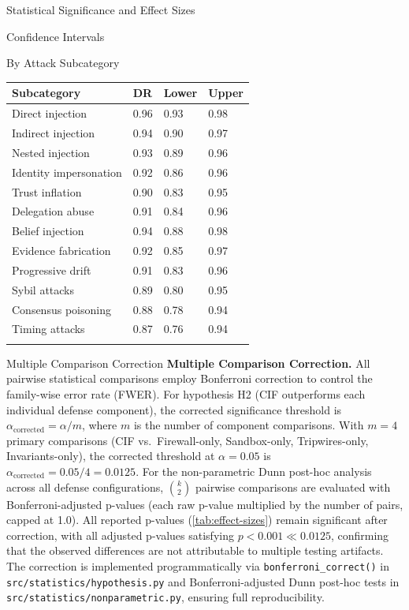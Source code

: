 \documentclass[
  ignorenonframetext,
]{beamer}
\newcounter{none} %
\begin{document}
\begin{frame}[fragile]{Statistical Significance and Effect Sizes}
\begin{block}{Confidence Intervals}
\begin{block}{By Attack Subcategory}
{\def\LTcaptype{none} %
\begin{longtable}[]{@{}llll@{}}
\toprule\noalign{}
Subcategory & DR & Lower & Upper \\
\midrule\noalign{}
\endhead
Direct injection & 0.96 & 0.93 & 0.98 \\
Indirect injection & 0.94 & 0.90 & 0.97 \\
Nested injection & 0.93 & 0.89 & 0.96 \\
Identity impersonation & 0.92 & 0.86 & 0.96 \\
Trust inflation & 0.90 & 0.83 & 0.95 \\
Delegation abuse & 0.91 & 0.84 & 0.96 \\
Belief injection & 0.94 & 0.88 & 0.98 \\
Evidence fabrication & 0.92 & 0.85 & 0.97 \\
Progressive drift & 0.91 & 0.83 & 0.96 \\
Sybil attacks & 0.89 & 0.80 & 0.95 \\
Consensus poisoning & 0.88 & 0.78 & 0.94 \\
Timing attacks & 0.87 & 0.76 & 0.94 \\
\bottomrule\noalign{}
\end{longtable}
}
\end{block}
\end{block}

\begin{block}{Multiple Comparison Correction}
\protect{}\label{sec:bonferroni}
\textbf{Multiple Comparison Correction.} All pairwise statistical
comparisons employ Bonferroni correction to control the family-wise
error rate (FWER). For hypothesis H2 (CIF outperforms each individual
defense component), the corrected significance threshold is
\(\alpha_{\text{corrected}} = \alpha / m\), where \(m\) is the number of
component comparisons. With \(m = 4\) primary comparisons (CIF
vs.~Firewall-only, Sandbox-only, Tripwires-only, Invariants-only), the
corrected threshold at \(\alpha = 0.05\) is
\(\alpha_{\text{corrected}} = 0.05 / 4 = 0.0125\). For the
non-parametric Dunn post-hoc analysis across all defense configurations,
\(\binom{k}{2}\) pairwise comparisons are evaluated with
Bonferroni-adjusted p-values (each raw p-value multiplied by the number
of pairs, capped at 1.0). All reported p-values
(\cref{tab:effect-sizes}) remain significant after correction, with all
adjusted p-values satisfying \(p < 0.001 \ll 0.0125\), confirming that
the observed differences are not attributable to multiple testing
artifacts. The correction is implemented programmatically via
\texttt{bonferroni\_correct()} in \texttt{src/statistics/hypothesis.py}
and Bonferroni-adjusted Dunn post-hoc tests in
\texttt{src/statistics/nonparametric.py}, ensuring full reproducibility.
\end{block}


\end{frame}
\end{document}
